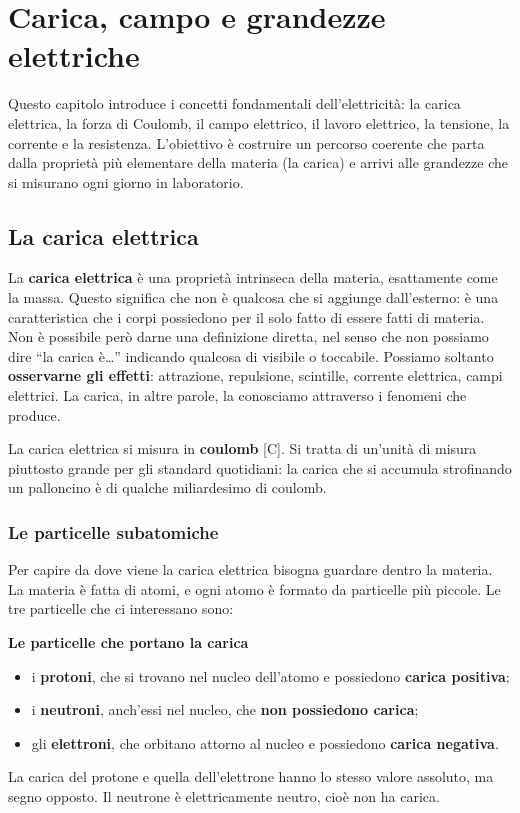 
\chapter{Carica, campo e grandezze elettriche}

\begin{concetto}
Questo capitolo introduce i concetti fondamentali dell'elettricità: la carica elettrica, la forza di Coulomb, il campo elettrico, il lavoro elettrico, la tensione, la corrente e la resistenza. L'obiettivo è costruire un percorso coerente che parta dalla proprietà più elementare della materia (la carica) e arrivi alle grandezze che si misurano ogni giorno in laboratorio.
\end{concetto}

\section{La carica elettrica}


La \textbf{carica elettrica} è una proprietà intrinseca della materia, esattamente come la massa. Questo significa che non è qualcosa che si aggiunge dall'esterno: è una caratteristica che i corpi possiedono per il solo fatto di essere fatti di materia. Non è possibile però darne una definizione diretta, nel senso che non possiamo dire ``la carica è\dots'' indicando qualcosa di visibile o toccabile. Possiamo soltanto \textbf{osservarne gli effetti}: attrazione, repulsione, scintille, corrente elettrica, campi elettrici. La carica, in altre parole, la conosciamo attraverso i fenomeni che produce.

La carica elettrica si misura in \textbf{coulomb} [\(\text{C}\)]. Si tratta di un'unità di misura piuttosto grande per gli standard quotidiani: la carica che si accumula strofinando un palloncino è di qualche miliardesimo di coulomb.

\subsection{Le particelle subatomiche}

Per capire da dove viene la carica elettrica bisogna guardare dentro la materia. La materia è fatta di atomi, e ogni atomo è formato da particelle più piccole. Le tre particelle che ci interessano sono:

\begin{concetto}
\textbf{Le particelle che portano la carica}
\begin{itemize}[leftmargin=1cm]
  \item i \textbf{protoni}, che si trovano nel nucleo dell'atomo e possiedono \textbf{carica positiva};
  \item i \textbf{neutroni}, anch'essi nel nucleo, che \textbf{non possiedono carica};
  \item gli \textbf{elettroni}, che orbitano attorno al nucleo e possiedono \textbf{carica negativa}.
\end{itemize}
La carica del protone e quella dell'elettrone hanno lo stesso valore assoluto, ma segno opposto. Il neutrone è elettricamente neutro, cioè non ha carica.
\end{concetto}

